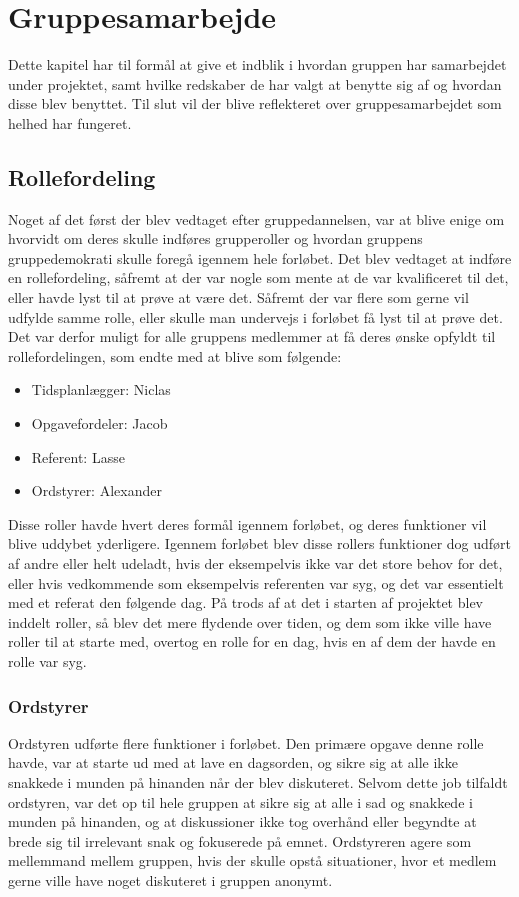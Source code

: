\chapter{Gruppesamarbejde}\label{Gruppesamarbejde}
Dette kapitel har til formål at give et indblik i hvordan gruppen har samarbejdet under projektet, samt hvilke redskaber de har valgt at benytte sig af og hvordan disse blev benyttet. Til slut vil der blive reflekteret over gruppesamarbejdet som helhed har fungeret.

\section{Rollefordeling}\label{Rollefordeling-1}

Noget af det først der blev vedtaget efter gruppedannelsen, var at blive enige om hvorvidt om deres skulle indføres grupperoller og hvordan gruppens gruppedemokrati skulle foregå igennem hele forløbet. Det blev vedtaget at indføre en rollefordeling, såfremt at der var nogle som mente at de var kvalificeret til det, eller havde lyst til at prøve at være det. Såfremt der var flere som gerne vil udfylde samme rolle, eller skulle man undervejs i forløbet få lyst til at prøve det. Det var derfor muligt for alle gruppens medlemmer at få deres ønske opfyldt til rollefordelingen, som endte med at blive som følgende:

\begin{itemize}
\item Tidsplanlægger: Niclas
\item Opgavefordeler: Jacob
\item Referent: Lasse
\item Ordstyrer: Alexander
\end{itemize}

Disse roller havde hvert deres formål igennem forløbet, og deres funktioner vil blive uddybet yderligere. Igennem forløbet blev disse rollers funktioner dog udført af andre eller helt udeladt, hvis der eksempelvis ikke var det store behov for det, eller hvis vedkommende som eksempelvis referenten var syg, og det var essentielt med et referat den følgende dag. På trods af at det i starten af projektet blev inddelt roller, så blev det mere flydende over tiden, og dem som ikke ville have roller til at starte med, overtog en rolle for en dag, hvis en af dem der havde en rolle var syg.
	
\subsection{Ordstyrer}\label{Ordstyrer-1}
Ordstyren udførte flere funktioner i forløbet. Den primære opgave denne rolle havde, var at starte ud med at lave en dagsorden, og sikre sig at alle ikke snakkede i munden på hinanden når der blev diskuteret. Selvom dette job tilfaldt ordstyren, var det op til hele gruppen at sikre sig at alle i sad og snakkede i munden på hinanden, og at diskussioner ikke tog overhånd eller begyndte at brede sig til irrelevant snak og fokuserede på emnet. Ordstyreren agere som mellemmand mellem gruppen, hvis der skulle opstå situationer, hvor et medlem gerne ville have noget diskuteret i gruppen anonymt. 

